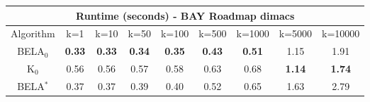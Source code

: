 \begin{tabular}{c|cccccccc}\toprule
\multicolumn{9}{c}{Runtime (seconds) - BAY Roadmap dimacs}\\ \midrule
Algorithm & k=1 & k=10 & k=50 & k=100 & k=500 & k=1000 & k=5000 & k=10000 \\ \midrule
BELA$_0$ & \textbf{0.33} & \textbf{0.33} & \textbf{0.34} & \textbf{0.35} & \textbf{0.43} & \textbf{0.51} & 1.15 & 1.91 \\
K$_0$ & 0.56 & 0.56 & 0.57 & 0.58 & 0.63 & 0.68 & \textbf{1.14} & \textbf{1.74} \\
BELA$^*$ & 0.37 & 0.37 & 0.39 & 0.40 & 0.52 & 0.65 & 1.63 & 2.79 \\ \bottomrule 
\end{tabular}
